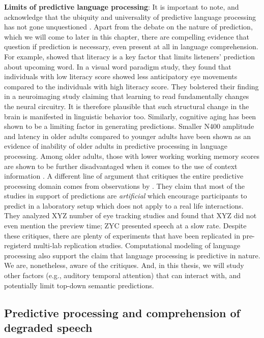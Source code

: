 \documentclass[a4paper, nobind]{templates/ociamthesis}
\begin{document}
\textbf{Limits of predictive language processing}:
It is important to note, and acknowledge that the ubiquity and universality of predictive language processing has not gone unquestioned \autocite{Huettig2016}.
Apart from the debate on the nature of prediction, which we will come to later in this chapter, there are compelling evidence that question if prediction is necessary, even present at all in language comprehension.
For example, \textcite{Mishra2012} showed that literacy is a key factor that limits listeners' prediction about upcoming word.
In a visual word paradigm study, they found that individuals with low literacy score showed less anticipatory eye movements compared to the individuals with high literacy score.
They bolstered their finding in a neuroimaging study claiming that learning to read fundamentally changes the neural circuitry.
It is therefore plausible that such structural change in the brain is manifested in linguistic behavior too.
Similarly, cognitive aging has been shown to be a limiting factor in generating predictions.
Smaller N400 amplitude and latency in older adults compared to younger adults have been shown as an evidence of inability of older adults in predictive processing in language processing.
Among older adults, those with lower working working memory scores are shown to be further disadvantaged when it comes to the use of context information \autocite{Federmeier2002,Federmeier2010}.
A different line of argument that critiques the entire predictive processing domain comes from observations by \textcite{Huettig2019}.
They claim that most of the studies in support of predictions are \emph{artificial} which encourage participants to predict in a laboratory setup which does not apply to a real life interactions.
They analyzed XYZ number of eye tracking studies and found that XYZ did not even mention the preview time; ZYC presented speech at a slow rate.
Despite these critiques, there are plenty of experiments that have been replicated in pre-registerd multi-lab replication studies.
Computational modeling of language processing also support the claim that language processing is predictive in nature.
We are, nonetheless, aware of the critiques.
And, in this thesis, we will study other factors (e.g., auditory temporal attention) that can interact with, and potentially limit top-down semantic predictions.

\hypertarget{predictive-processing-and-comprehension-of-degraded-speech}{%
\subsection{Predictive processing and comprehension of degraded speech}\label{predictive-processing-and-comprehension-of-degraded-speech}}
\end{document}

